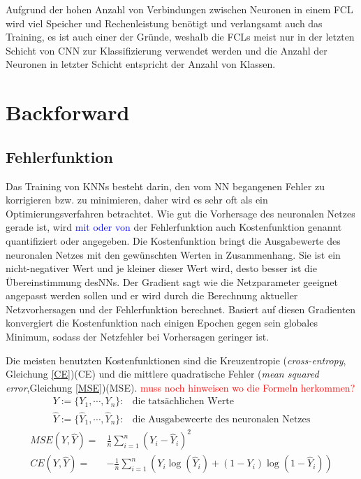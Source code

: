 \documentclass[12pt,a4paper]{scrartcl}
\numberwithin{equation}{section}
\begin{document}
Aufgrund der hohen Anzahl von Verbindungen zwischen Neuronen in einem \ac{FCL} wird viel Speicher und Rechenleistung benötigt und verlangsamt auch das Training, es ist auch einer der Gründe, weshalb die \acsp{FCL} meist nur in der letzten Schicht von \ac{CNN} zur Klassifizierung verwendet werden und die Anzahl der Neuronen in letzter Schicht entspricht der Anzahl von Klassen.



\section{Backforward }
\subsection{Fehlerfunktion}

Das Training von \acsp{KNN} besteht darin, den vom \ac{NN} begangenen Fehler zu korrigieren bzw. zu minimieren, daher wird es sehr oft als ein Optimierungsverfahren betrachtet.
Wie gut die Vorhersage des neuronalen Netzes gerade ist, wird \textcolor{blue}{mit oder von} der Fehlerfunktion auch Kostenfunktion genannt quantifiziert oder angegeben.
Die Kostenfunktion bringt die Ausgabewerte des neuronalen Netzes mit den gewünschten Werten in Zusammenhang. Sie ist ein nicht-negativer Wert und je kleiner dieser Wert wird, desto besser ist die Übereinstimmung des\acsp{NN}.
Der Gradient sagt wie die Netzparameter geeignet angepasst werden sollen und er wird durch die Berechnung aktueller Netzvorhersagen und der Fehlerfunktion berechnet. Basiert auf diesen Gradienten konvergiert die Kostenfunktion nach einigen Epochen gegen sein globales Minimum, sodass der Netzfehler bei Vorhersagen geringer ist.

Die meisten benutzten Kostenfunktionen sind die Kreuzentropie (\textit{cross-entropy}, Gleichung \ref{CE})(CE) und die mittlere quadratische Fehler (\textit{mean squared error},Gleichung \ref{MSE})(MSE). \textcolor{red}{muss noch hinweisen wo die Formeln herkommen?}
\begin{align*}
	Y:=\{Y_1,\cdots, Y_n\} :&\text{die tatsächlichen Werte} \\
	\widehat{Y}:=\{\widehat{Y}_1,\cdots, \widehat{Y}_n\} :&\text{die Ausgabeweerte des neuronalen Netzes}
\end{align*}
\begin{align}
	\label{MSE}	
	MSE(Y, \widehat{Y}) =&\frac{1}{n}\sum_{i = 1}^{n}(Y_i - \widehat{Y}_i)^2\\
	\label{CE}
	CE(Y, \widehat{Y}) =&-\frac{1}{n}\sum_{i = 1}^{n}(Y_i\log(\widehat{Y}_i) +(1-Y_i)\log(1- \widehat{Y}_i))
\end{align}
\end{document}
